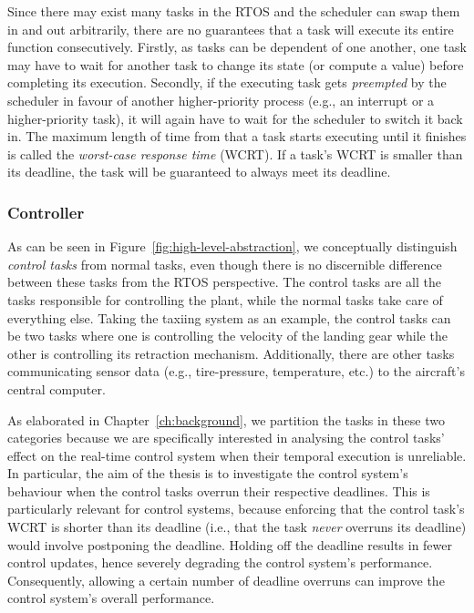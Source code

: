 Since there may exist many tasks in the RTOS and the scheduler can swap them in and out arbitrarily, there are no guarantees that a task will execute its entire function consecutively.
Firstly, as tasks can be dependent of one another, one task may have to wait for another task to change its state (or compute a value) before completing its execution.
Secondly, if the executing task gets \emph{preempted} by the scheduler in favour of another higher-priority process (e.g., an interrupt or a higher-priority task), it will again have to wait for the scheduler to switch it back in.
The maximum length of time from that a task starts executing until it finishes is called the \emph{worst-case response time} (WCRT).
If a task's WCRT is smaller than its deadline, the task will be guaranteed to always meet its deadline.

\subsubsection{Controller}%
%
As can be seen in Figure~\ref{fig:high-level-abstraction}, we conceptually distinguish \emph{control tasks} from normal tasks, even though there is no discernible difference between these tasks from the RTOS perspective.
The control tasks are all the tasks responsible for controlling the plant, while the normal tasks take care of everything else.
Taking the taxiing system as an example, the control tasks can be two tasks where one is controlling the velocity of the landing gear while the other is controlling its retraction mechanism.
Additionally, there are other tasks communicating sensor data (e.g., tire-pressure, temperature, etc.) to the aircraft's central computer.

As elaborated in Chapter~\ref{ch:background}, we partition the tasks in these two categories because we are specifically interested in analysing the control tasks' effect on the real-time control system when their temporal execution is unreliable.
In particular, the aim of the thesis is to investigate the control system's behaviour when the control tasks overrun their respective deadlines.
This is particularly relevant for control systems, because enforcing that the control task's WCRT is shorter than its deadline (i.e., that the task \emph{never} overruns its deadline) would involve postponing the deadline.
Holding off the deadline results in fewer control updates, hence severely degrading the control system's performance.
Consequently, allowing a certain number of deadline overruns can improve the control system's overall performance.

